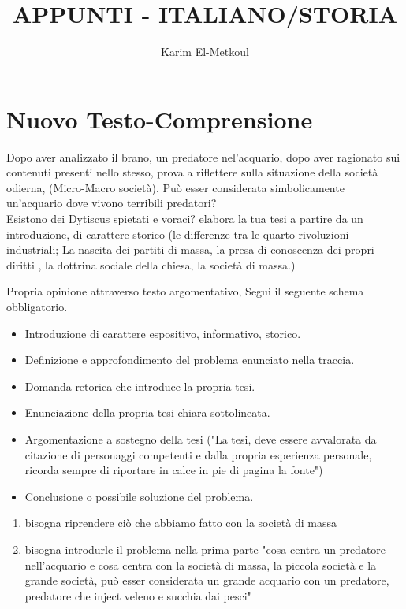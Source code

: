 \documentclass{article}
\title{APPUNTI - ITALIANO/STORIA}
\author{Karim El-Metkoul}
\begin{document}
\maketitle

\section{Nuovo Testo-Comprensione}
Dopo aver analizzato il brano, un predatore nel'acquario, dopo aver ragionato sui contenuti
 presenti nello stesso, prova a riflettere sulla situazione della società odierna, (Micro-Macro società).
Può esser considerata simbolicamente un'acquario dove vivono terribili predatori?
\\Esistono dei Dytiscus spietati e voraci?
elabora la tua tesi a partire da un introduzione, di carattere storico (le differenze tra le quarto rivoluzioni industriali; La nascita dei partiti di massa, la presa di conoscenza dei propri diritti , la dottrina sociale della chiesa, la società di massa.)

Propria opinione attraverso testo argomentativo, Segui il seguente schema obbligatorio.\\

\graphicspath{ {image.png} }

\begin{itemize}
    \item Introduzione di carattere espositivo, informativo, storico.
    \item Definizione e approfondimento del problema enunciato nella traccia.
    \item Domanda retorica che introduce la propria tesi. 
    \item Enunciazione della propria tesi chiara sottolineata.
    \item Argomentazione a sostegno della tesi ("La tesi, deve essere avvalorata da citazione di personaggi competenti e dalla propria esperienza personale, ricorda sempre di riportare in calce 
    in pie di pagina la fonte")
    \item Conclusione o possibile soluzione del problema.

\end{itemize}   

\begin{enumerate}
  \item bisogna riprendere ciò che abbiamo fatto con la società di massa
  \item bisogna introdurle il problema nella prima parte "cosa centra un predatore nell'acquario e cosa centra con la società di massa,
  la piccola società e la grande società, può esser considerata un grande acquario con un predatore,
  predatore che inject veleno e succhia dai pesci"
\end{enumerate}
\end{document}
